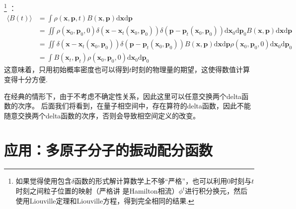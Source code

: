     \footnote{
        如果觉得使用包含$\delta$函数的形式解计算数学上不够“严格”，也可以利用0时刻与$t$时刻之间粒子位置的映射（严格讲
        是Hamilton相流）$\phi^t$进行积分换元，然后使用Liouville定理和Liouville方程，得到完全相同的结果.
    }
    ：
    \begin{equation}
        \begin{split}
            \langle B(t) \rangle &= \int \rho(\bm{x},\bm{p},t) B(\bm{x},\bm{p}) \mathrm{d}\bm{x}\mathrm{d}\bm{p}\\
            &= \iint \rho(\bm{x}_0,\bm{p}_0,0)\delta(\bm{x}-\bm{x}_t(\bm{x}_0,\bm{p}_0)) \delta(\bm{p}-\bm{p}_t(\bm{x}_0,\bm{p}_0)) \mathrm{d}\bm{x}_0\mathrm{d}\bm{p}_0 B(\bm{x},\bm{p}) \mathrm{d}\bm{x}\mathrm{d}\bm{p}\\
            &= \iint \delta(\bm{x}-\bm{x}_t(\bm{x}_0,\bm{p}_0)) \delta(\bm{p}-\bm{p}_t(\bm{x}_0,\bm{p}_0)) B(\bm{x},\bm{p}) \mathrm{d}\bm{x}\mathrm{d}\bm{p} \rho(\bm{x}_0,\bm{p}_0,0) \mathrm{d}\bm{x}_0\mathrm{d}\bm{p}_0\\
            &= \int B(\bm{x}_t,\bm{p}_t) \rho(\bm{x}_0,\bm{p}_0,0)\mathrm{d}\bm{x}_0\mathrm{d}\bm{p}_0
        \end{split}
    \end{equation}
    这意味着，只用初始概率密度也可以得到$t$时刻的物理量的期望，这使得数值计算变得十分方便.

    在经典的情形下，由于不考虑不确定性关系，因此这里可以任意交换两个delta函数的次序。
    后面我们将看到，在量子相空间中，存在算符的delta函数，因此不能随意交换两个delta函数的次序，否则会导致相空间定义的改变。

    \section{应用：多原子分子的振动配分函数}

